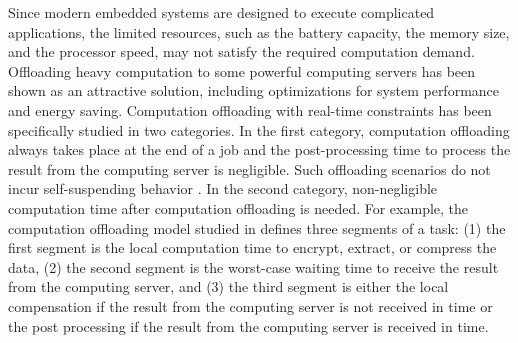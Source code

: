 Since modern embedded systems are designed to execute complicated applications, the limited resources, such as the battery capacity, the memory size, and the processor speed, may not satisfy the required computation demand. Offloading heavy computation to some powerful computing servers has been shown as an attractive solution, including optimizations for system performance and energy saving.
Computation offloading with real-time constraints has been specifically studied in two categories. In the first category, computation offloading always takes place at the end of a job and the post-processing time to process the result from the computing server is negligible. Such offloading scenarios do not incur self-suspending behavior  \cite{nimmagadda2010real,DBLP:conf/ecrts/TomaC13}. In the second category, non-negligible computation time after computation offloading is needed. For example, the computation offloading model studied in \cite{Liu_2014} defines three segments of a task: (1) the first segment is the local computation time to encrypt, extract, or compress the data, (2) the second segment is the worst-case waiting time to receive the result from the computing server, and (3) the third segment is either the local compensation if the result from the computing server is not received in time or the post processing if the result from the computing server is received in time. 

  
  


